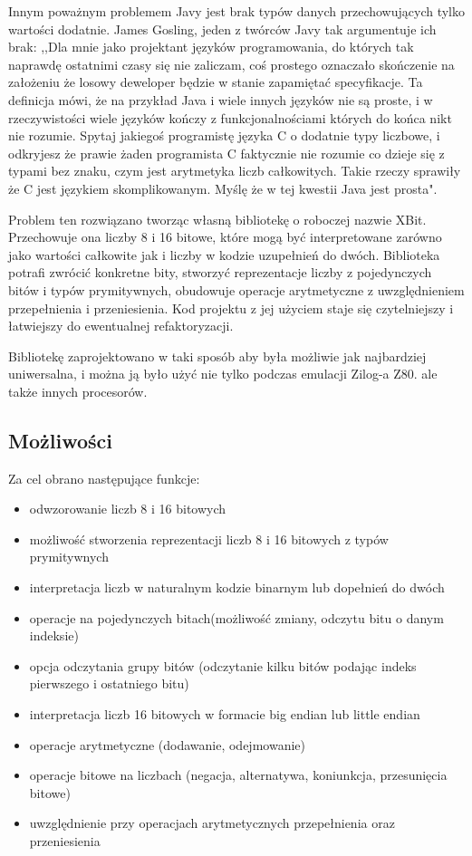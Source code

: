 	Innym poważnym problemem Javy jest brak typów danych przechowujących tylko wartości dodatnie. James Gosling, jeden z twórców Javy tak argumentuje ich brak: 
	,,Dla mnie jako projektant języków programowania, do których tak naprawdę ostatnimi czasy się nie zaliczam, coś prostego oznaczało skończenie na założeniu że losowy deweloper będzie w stanie zapamiętać specyfikacje. 
	Ta definicja mówi, że na przykład Java i wiele innych języków nie są proste, i w rzeczywistości wiele języków kończy z funkcjonalnościami których do końca nikt nie rozumie. Spytaj jakiegoś programistę języka C o dodatnie typy liczbowe, i odkryjesz że prawie żaden programista C faktycznie nie rozumie co dzieje się z typami bez znaku, czym jest arytmetyka liczb całkowitych. Takie rzeczy sprawiły że C jest językiem skomplikowanym. Myślę że w tej kwestii Java jest prosta"\cite{javaGoslingInterview}.
	
	Problem ten rozwiązano tworząc własną bibliotekę o roboczej nazwie XBit. Przechowuje ona liczby 8 i 16 bitowe, które mogą być interpretowane zarówno jako wartości całkowite jak i liczby w kodzie uzupełnień do dwóch. Biblioteka potrafi zwrócić konkretne bity, stworzyć reprezentacje liczby z pojedynczych bitów i typów prymitywnych, obudowuje operacje arytmetyczne z uwzględnieniem przepełnienia i przeniesienia. Kod projektu z jej użyciem staje się czytelniejszy i łatwiejszy do ewentualnej refaktoryzacji. 
	
	Bibliotekę zaprojektowano w taki sposób aby była możliwie jak najbardziej uniwersalna, i można ją było użyć nie tylko podczas emulacji Zilog-a Z80. ale także innych procesorów. 
	
	\subsection{Możliwości}
	Za cel obrano następujące funkcje:
	\begin{itemize}  
		\item odwzorowanie liczb 8 i 16 bitowych
		\item możliwość stworzenia reprezentacji liczb 8 i 16 bitowych z typów prymitywnych 
		\item interpretacja liczb w naturalnym kodzie binarnym lub dopełnień do dwóch
		\item operacje na pojedynczych bitach(możliwość zmiany, odczytu bitu o danym indeksie)
		\item opcja odczytania grupy bitów (odczytanie kilku bitów podając indeks pierwszego i ostatniego bitu)
		\item interpretacja liczb 16 bitowych w formacie big endian lub little endian
		\item operacje arytmetyczne (dodawanie, odejmowanie)
		\item operacje bitowe na liczbach (negacja, alternatywa, koniunkcja, przesunięcia bitowe)
		\item uwzględnienie przy operacjach arytmetycznych przepełnienia oraz przeniesienia
	\end{itemize} 
	
